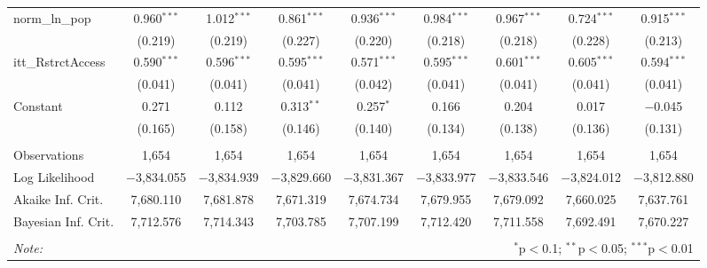 \begin{sidewaystable}[!htbp]
\begin{tabular}{@{\extracolsep{5pt}}lcccccccc}
  norm\_ln\_pop & 0.960$^{***}$ & 1.012$^{***}$ & 0.861$^{***}$ & 0.936$^{***}$ & 0.984$^{***}$ & 0.967$^{***}$ & 0.724$^{***}$ & 0.915$^{***}$ \\ 
  & (0.219) & (0.219) & (0.227) & (0.220) & (0.218) & (0.218) & (0.228) & (0.213) \\ 
  itt\_RstrctAccess & 0.590$^{***}$ & 0.596$^{***}$ & 0.595$^{***}$ & 0.571$^{***}$ & 0.595$^{***}$ & 0.601$^{***}$ & 0.605$^{***}$ & 0.594$^{***}$ \\ 
  & (0.041) & (0.041) & (0.041) & (0.042) & (0.041) & (0.041) & (0.041) & (0.041) \\ 
  Constant & 0.271 & 0.112 & 0.313$^{**}$ & 0.257$^{*}$ & 0.166 & 0.204 & 0.017 & $-$0.045 \\ 
  & (0.165) & (0.158) & (0.146) & (0.140) & (0.134) & (0.138) & (0.136) & (0.131) \\ 
 \hline \\[-1.8ex] 
Observations & 1,654 & 1,654 & 1,654 & 1,654 & 1,654 & 1,654 & 1,654 & 1,654 \\ 
Log Likelihood & $-$3,834.055 & $-$3,834.939 & $-$3,829.660 & $-$3,831.367 & $-$3,833.977 & $-$3,833.546 & $-$3,824.012 & $-$3,812.880 \\ 
Akaike Inf. Crit. & 7,680.110 & 7,681.878 & 7,671.319 & 7,674.734 & 7,679.955 & 7,679.092 & 7,660.025 & 7,637.761 \\ 
Bayesian Inf. Crit. & 7,712.576 & 7,714.343 & 7,703.785 & 7,707.199 & 7,712.420 & 7,711.558 & 7,692.491 & 7,670.227 \\ 
\hline 
\hline \\[-1.8ex] 
\textit{Note:}  & \multicolumn{8}{r}{$^{*}$p$<$0.1; $^{**}$p$<$0.05; $^{***}$p$<$0.01} \\ 
\end{tabular} 
\end{sidewaystable} 
